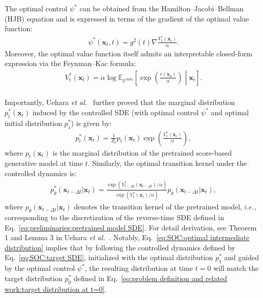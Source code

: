The optimal control $\psi^*$ can be obtained from the Hamilton–Jacobi–Bellman (HJB) equation and is expressed in terms of the gradient of the optimal value function:
\begin{align}
    \label{eq:SOC:optimal control}
    \psi^*(\mathbf{x}_t,t)=g^2(t)\nabla \frac{V_t^*(\mathbf{x}_t)}{\alpha}.
\end{align}
Moreover, the optimal value function itself admits an interpretable closed-form expression via the Feynman–Kac formula:
\begin{align}
    \label{eq:SOC:feynman-kac}
    V_t^*(\mathbf{x}_t)=\alpha \log \mathbb{E}_{\mathbb{P}^{\text{data}}}\left[ \exp \left( \frac{r(\mathbf{x}_0)}{\alpha} 
   \right) \middle| \mathbf{x}_t \right].
\end{align}\\
Importantly, Uehara \textit{et al.}~\cite{uehara2024finetuningcontinuoustimediffusionmodels} further proved that the marginal distribution $p_t^*(\mathbf{x}_t)$ induced by the controlled SDE (with optimal control $\psi^*$ and optimal initial distribution $p_1^*$) is given by:
\begin{align}
    \label{eq:SOC:optimal intermediate distribution}
    p_t^*(\mathbf{x}_t)=\frac{1}{Z_t}p_t(\mathbf{x}_t)\exp \left( \frac{V_t^*(\mathbf{x}_t)}{\alpha} \right),
\end{align}
where $p_t(\mathbf{x}_t)$ is the marginal distribution of the pretrained score-based generative model at time $t$.
Similarly, the optimal transition kernel under the controlled dynamics is:
\begin{align}
    \label{eq:SOC:optimal transition kernel}
    p_\theta^*(\mathbf{x}_{t-\Delta t}|\mathbf{x}_t)=\frac{\exp (V_{t-\Delta t}^*(\mathbf{x}_{t-\Delta t})/\alpha)}{\exp (V_t^*(\mathbf{x}_t)/\alpha)}p_\theta (\mathbf{x}_{t-\Delta t}|\mathbf{x}_t),
\end{align}
where $p_\theta (\mathbf{x}_{t-\Delta t}|\mathbf{x}_t)$ denotes the transition kernel of the pretrained model, $i.e.$, corresponding to the discretization of the reverse-time SDE defined in Eq.~\ref{eq:preliminaries:pretrained model SDE}.
For detail derivation, see Theorem 1 and Lemma 3 in Uehara \textit{et al.}~\cite{uehara2024finetuningcontinuoustimediffusionmodels}.
Notably, Eq.~\ref{eq:SOC:optimal intermediate distribution} implies that by following the controlled dynamics defined by Eq.~\ref{eq:SOC:target SDE}, initialized with the optimal distribution $p_1^*$ and guided by the optimal control $\psi^*$, the resulting distribution at time $t=0$ will match the target distribution $p_0^*$ defined in Eq.~\ref{eq:problem definition and related work:target distribution at t=0}.\\

